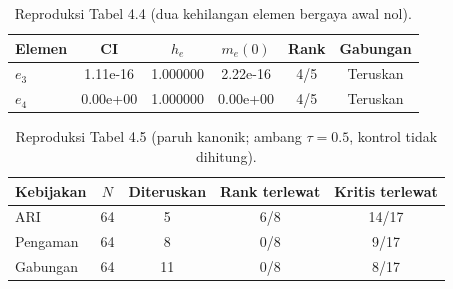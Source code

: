 \begin{table}[htbp]\centering
\caption{Reproduksi Tabel 4.4 (dua kehilangan elemen bergaya awal nol).}
\label{tab:repro44}
\begin{tabular}{lccccc}\hline
Elemen & CI & $h_e$ & $m_e(0)$ & Rank & Gabungan \\
\hline
$e_3$ & 1.11e-16 & 1.000000 & 2.22e-16 & 4/5 & Teruskan \\
$e_4$ & 0.00e+00 & 1.000000 & 0.00e+00 & 4/5 & Teruskan \\
\hline\end{tabular}\end{table}

\begin{table}[htbp]\centering
\caption{Reproduksi Tabel 4.5 (paruh kanonik; ambang $\tau=0.5$, kontrol tidak dihitung).}
\label{tab:repro45}
\begin{tabular}{lcccc}\hline
Kebijakan & $N$ & Diteruskan & Rank terlewat & Kritis terlewat \\
\hline
ARI & 64 & 5 & 6/8 & 14/17 \\
Pengaman & 64 & 8 & 0/8 & 9/17 \\
Gabungan & 64 & 11 & 0/8 & 8/17 \\
\hline\end{tabular}\end{table}
